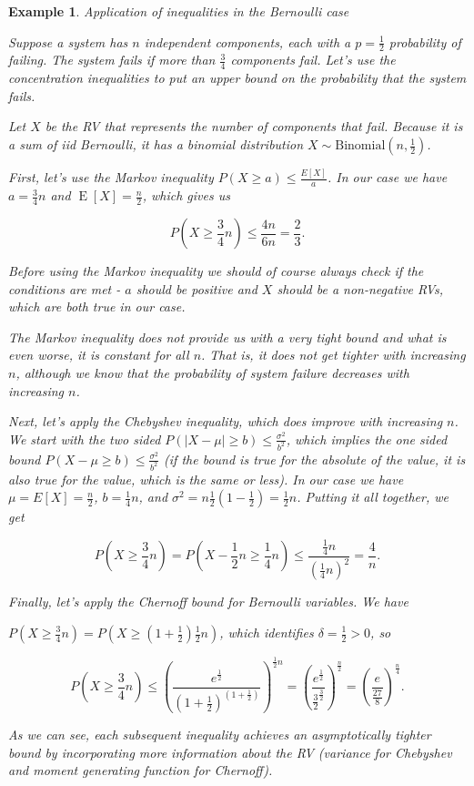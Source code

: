 \documentclass{book}
\theoremstyle{plain}%
\newtheorem{prototheorem}{Example}[section]
\newenvironment{cexample}
   {\colorlet{shadecolor}{gray!10}\begin{shaded}\begin{prototheorem}}
   {\end{prototheorem}\end{shaded}}
\theoremstyle{definition}
\DeclareMathOperator{\E}{E}
\begin{document}
\begin{cexample}{Application of inequalities in the Bernoulli case}

Suppose a system has $n$ independent components, each with a $p = \frac{1}{2}$ probability of failing. The system fails if more than $\frac{3}{4}$ components fail. Let's use the concentration inequalities to put an upper bound on the probability that the system fails.

Let $X$ be the RV that represents the number of components that fail. Because it is a sum of iid Bernoulli, it has a binomial distribution $X \sim \text{Binomial}(n, \frac{1}{2})$.

First, let's use the Markov inequality $P(X \geq a) \leq \frac{E[X]}{a}$. In our case we have $a = \frac{3}{4}n$ and $\E[X] = \frac{n}{2}$, which gives us

$$P(X \geq \frac{3}{4}n) \leq \frac{4n}{6n} = \frac{2}{3}.$$

Before using the Markov inequality we should of course always check if the conditions are met - $a$ should be positive and $X$ should be a non-negative RVs, which are both true in our case.

The Markov inequality does not provide us with a very tight bound and what is even worse, it is constant for all $n$. That is, it does not get tighter with increasing $n$, although we know that the probability of system failure decreases with increasing $n$.

Next, let's apply the Chebyshev inequality, which does improve with increasing $n$. We start with the two sided $P(|X - \mu| \geq b) \leq \frac{\sigma^2}{b^2}$, which implies the one sided bound $P(X - \mu \geq b) \leq \frac{\sigma^2}{b^2}$ (if the bound is true for the absolute of the value, it is also true for the value, which is the same or less). In our case we have $\mu = E[X] = \frac{n}{2}$, $b = \frac{1}{4}n$, and $\sigma^2 = n\frac{1}{2}(1 - \frac{1}{2}) = \frac{1}{2}n$. Putting it all together, we get

$$P(X \geq \frac{3}{4}n) = P(X - \frac{1}{2}n \geq \frac{1}{4}n) \leq \frac{\frac{1}{4}n}{(\frac{1}{4}n)^2} = \frac{4}{n}.$$

Finally, let's apply the Chernoff bound for Bernoulli variables. We have

$P(X \geq \frac{3}{4}n) = P(X \geq (1 + \frac{1}{2})\frac{1}{2}n)$, which identifies $\delta = \frac{1}{2} > 0$, so

$$P(X \geq \frac{3}{4}n) \leq \left(\frac{e^{\frac{1}{2}}}{(1 + \frac{1}{2})^{(1 + \frac{1}{2})}}\right)^{\frac{1}{2}n} = \left(\frac{e^{\frac{1}{2}}}{\frac{3}{2}^{\frac{3}{2}}}\right)^{\frac{n}{2}} = \left(\frac{e}{{\frac{27}{8}}}\right)^{\frac{n}{4}}.$$

As we can see, each subsequent inequality achieves an asymptotically tighter bound by incorporating more information about the RV (variance for Chebyshev and moment generating function for Chernoff).
\label{ex:ineq_binom}
\end{cexample}
\end{document}
